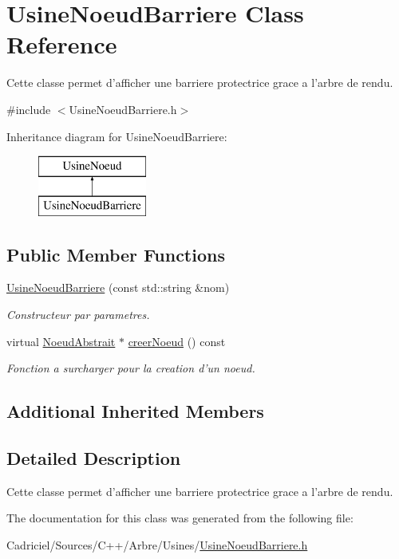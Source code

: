 \hypertarget{class_usine_noeud_barriere}{\section{Usine\-Noeud\-Barriere Class Reference}
\label{class_usine_noeud_barriere}
}


Cette classe permet d'afficher une barriere protectrice grace a l'arbre de rendu.  




{\ttfamily \#include $<$Usine\-Noeud\-Barriere.\-h$>$}

Inheritance diagram for Usine\-Noeud\-Barriere\-:\begin{figure}[H]
\begin{center}
\leavevmode
\includegraphics[height=2.000000cm]{class_usine_noeud_barriere}
\end{center}
\end{figure}
\subsection*{Public Member Functions}
\begin{DoxyCompactItemize}
\item 
\hyperlink{group__inf2990_ga0ec1e3a0fbfbc601eb2bafd5c9e207f0}{Usine\-Noeud\-Barriere} (const std\-::string \&nom)
\begin{DoxyCompactList}\small\item\em Constructeur par parametres. \end{DoxyCompactList}\item 
virtual \hyperlink{class_noeud_abstrait}{Noeud\-Abstrait} $\ast$ \hyperlink{group__inf2990_ga4ff463b2444d5e81b54c6c3200c74136}{creer\-Noeud} () const 
\begin{DoxyCompactList}\small\item\em Fonction a surcharger pour la creation d'un noeud. \end{DoxyCompactList}\end{DoxyCompactItemize}
\subsection*{Additional Inherited Members}


\subsection{Detailed Description}
Cette classe permet d'afficher une barriere protectrice grace a l'arbre de rendu. 

The documentation for this class was generated from the following file\-:\begin{DoxyCompactItemize}
\item 
Cadriciel/\-Sources/\-C++/\-Arbre/\-Usines/\hyperlink{_usine_noeud_barriere_8h}{Usine\-Noeud\-Barriere.\-h}\end{DoxyCompactItemize}
